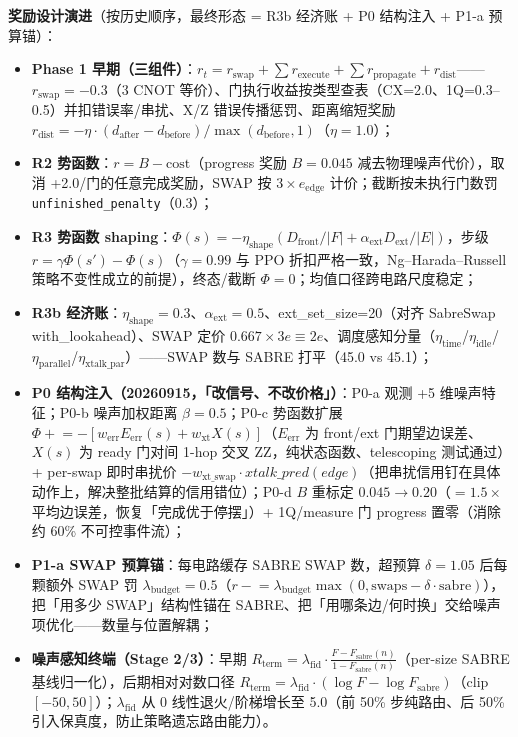 \textbf{奖励设计演进}（按历史顺序，最终形态 = R3b 经济账 + P0 结构注入 + P1-a 预算锚）：
\begin{itemize}
    \item \textbf{Phase 1 早期（三组件）}：$r_t=r_{\mathrm{swap}}+\sum r_{\mathrm{execute}}+\sum r_{\mathrm{propagate}}+r_{\mathrm{dist}}$——$r_{\mathrm{swap}}=-0.3$（3 CNOT 等价）、门执行收益按类型查表（CX=2.0、1Q=0.3--0.5）并扣错误率/串扰、X/Z 错误传播惩罚、距离缩短奖励 $r_{\mathrm{dist}}=-\eta\cdot(d_{\mathrm{after}}-d_{\mathrm{before}})/\max(d_{\mathrm{before}},1)$（$\eta=1.0$）；
    \item \textbf{R2 势函数}：$r=B-\mathrm{cost}$（progress 奖励 $B=0.045$ 减去物理噪声代价），取消 +2.0/门的任意完成奖励，SWAP 按 $3\times e_{\mathrm{edge}}$ 计价；截断按未执行门数罚 \texttt{unfinished\_penalty}（0.3）；
    \item \textbf{R3 势函数 shaping}：$\Phi(s)=-\eta_{\mathrm{shape}}(D_{\mathrm{front}}/|F|+\alpha_{\mathrm{ext}}D_{\mathrm{ext}}/|E|)$，步级 $r=\gamma\Phi(s')-\Phi(s)$（$\gamma=0.99$ 与 PPO 折扣严格一致，Ng--Harada--Russell 策略不变性成立的前提），终态/截断 $\Phi=0$；均值口径跨电路尺度稳定；
    \item \textbf{R3b 经济账}：$\eta_{\mathrm{shape}}=0.3$、$\alpha_{\mathrm{ext}}=0.5$、ext\_set\_size=20（对齐 SabreSwap with\_lookahead）、SWAP 定价 $0.667\times 3e\equiv 2e$、调度感知分量（$\eta_{\mathrm{time}}$/$\eta_{\mathrm{idle}}$/$\eta_{\mathrm{parallel}}$/$\eta_{\mathrm{xtalk\_par}}$）——SWAP 数与 SABRE 打平（45.0 vs 45.1）；
    \item \textbf{P0 结构注入（20260915，「改信号、不改价格」）}：P0-a 观测 +5 维噪声特征；P0-b 噪声加权距离 $\beta=0.5$；P0-c 势函数扩展 $\Phi\mathrel{+}=-[w_{\mathrm{err}}E_{\mathrm{err}}(s)+w_{\mathrm{xt}}X(s)]$（$E_{\mathrm{err}}$ 为 front/ext 门期望边误差、$X(s)$ 为 ready 门对间 1-hop 交叉 ZZ，纯状态函数、telescoping 测试通过）+ per-swap 即时串扰价 $-w_{\mathrm{xt\_swap}}\cdot xtalk\_pred(edge)$（把串扰信用钉在具体动作上，解决整批结算的信用错位）；P0-d $B$ 重标定 $0.045\to0.20$（$=1.5\times$ 平均边误差，恢复「完成优于停摆」）+ 1Q/measure 门 progress 置零（消除约 60\% 不可控事件流）；
    \item \textbf{P1-a SWAP 预算锚}：每电路缓存 SABRE SWAP 数，超预算 $\delta=1.05$ 后每颗额外 SWAP 罚 $\lambda_{\mathrm{budget}}=0.5$（$r\mathrel{-}=\lambda_{\mathrm{budget}}\max(0,\mathrm{swaps}-\delta\cdot\mathrm{sabre})$），把「用多少 SWAP」结构性锚在 SABRE、把「用哪条边/何时换」交给噪声项优化——数量与位置解耦；
    \item \textbf{噪声感知终端（Stage 2/3）}：早期 $R_{\mathrm{term}}=\lambda_{\mathrm{fid}}\cdot\frac{F-F_{\mathrm{sabre}}(n)}{1-F_{\mathrm{sabre}}(n)}$（per-size SABRE 基线归一化），后期相对对数口径 $R_{\mathrm{term}}=\lambda_{\mathrm{fid}}\cdot(\log F-\log F_{\mathrm{sabre}})$（clip $[-50,50]$）；$\lambda_{\mathrm{fid}}$ 从 0 线性退火/阶梯增长至 5.0（前 50\% 步纯路由、后 50\% 引入保真度，防止策略遗忘路由能力）。
\end{itemize}

